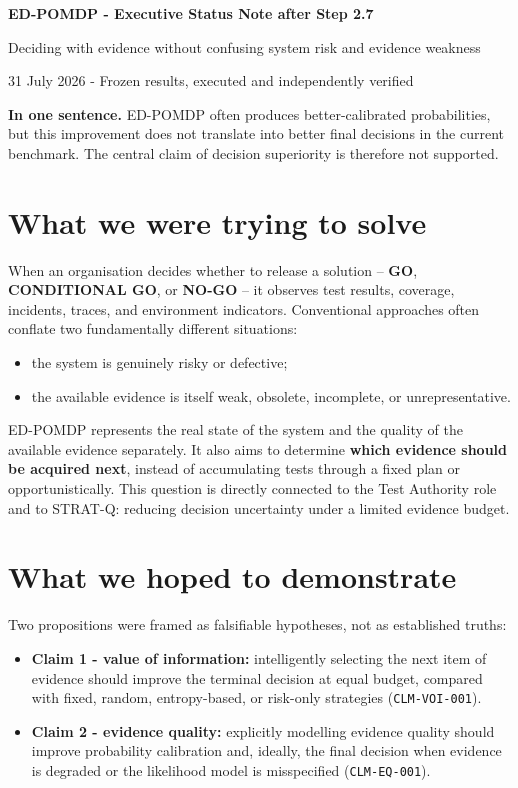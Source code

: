 \documentclass[11pt,a4paper]{article}
\newcommand{\claimvoi}{\texttt{CLM-VOI-001}}
\newcommand{\claimeq}{\texttt{CLM-EQ-001}}
\begin{document}
{\LARGE\bfseries\color{deepblue} ED-POMDP - Executive Status Note after Step 2.7}\par
{\large Deciding with evidence without confusing system risk and evidence weakness}\par
{\color{muted}31 July 2026 - Frozen results, executed and independently verified}

\begin{tcolorbox}[colback=softblue,colframe=deepblue,boxrule=0.7pt,arc=2mm]
\textbf{In one sentence.} ED-POMDP often produces better-calibrated probabilities, but this improvement does not translate into better final decisions in the current benchmark. The central claim of decision superiority is therefore not supported.
\end{tcolorbox}

\section*{What we were trying to solve}

When an organisation decides whether to release a solution -- \textbf{GO}, \textbf{CONDITIONAL GO}, or \textbf{NO-GO} -- it observes test results, coverage, incidents, traces, and environment indicators. Conventional approaches often conflate two fundamentally different situations:

\begin{itemize}
  \item the system is genuinely risky or defective;
  \item the available evidence is itself weak, obsolete, incomplete, or unrepresentative.
\end{itemize}

ED-POMDP represents the real state of the system and the quality of the available evidence separately. It also aims to determine \textbf{which evidence should be acquired next}, instead of accumulating tests through a fixed plan or opportunistically. This question is directly connected to the Test Authority role and to STRAT-Q: reducing decision uncertainty under a limited evidence budget.

\section*{What we hoped to demonstrate}

Two propositions were framed as falsifiable hypotheses, not as established truths:

\begin{itemize}
  \item \textbf{Claim 1 - value of information:} intelligently selecting the next item of evidence should improve the terminal decision at equal budget, compared with fixed, random, entropy-based, or risk-only strategies (\claimvoi).
  \item \textbf{Claim 2 - evidence quality:} explicitly modelling evidence quality should improve probability calibration and, ideally, the final decision when evidence is degraded or the likelihood model is misspecified (\claimeq).
\end{itemize}
\end{document}
